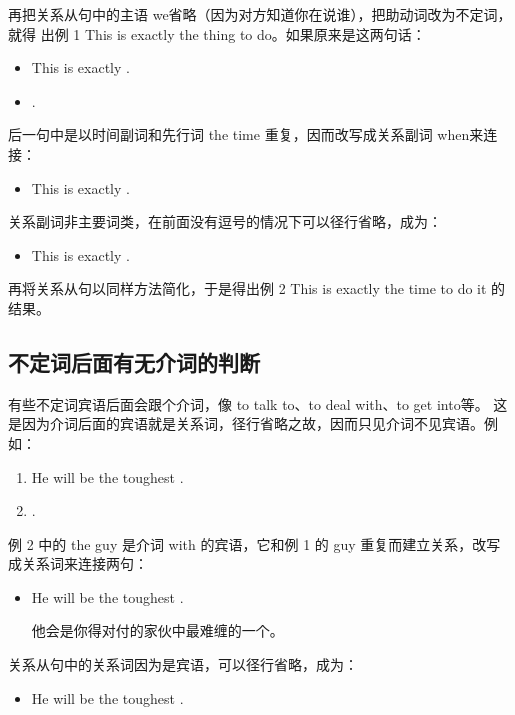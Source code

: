 再把关系从句中的主语 we省略（因为对方知道你在说谁），把助动词改为不定词，就得
出例 1 This is exactly the thing to do。如果原来是这两句话：
\begin{itemize}
\item This is exactly .
\item {}   .
\end{itemize}

后一句中是以时间副词和先行词 the time 重复，因而改写成关系副词 when来连接：
\begin{itemize}
\item This is exactly  .
\end{itemize}

关系副词非主要词类，在前面没有逗号的情况下可以径行省略，成为：
\begin{itemize}
\item This is exactly  .
\end{itemize}
再将关系从句以同样方法简化，于是得出例 2 This is exactly the time to do it 的
结果。

\subsection{不定词后面有无介词的判断}

有些不定词宾语后面会跟个介词，像 to talk to、to deal with、to get into等。
这是因为介词后面的宾语就是关系词，径行省略之故，因而只见介词不见宾语。例
如：
\begin{enumerate}
\item He will be the toughest .
\item {}   .
\end{enumerate}
例 2 中的 the guy 是介词 with 的宾语，它和例 1 的 guy
重复而建立关系，改写成关系词来连接两句：
\begin{itemize}
\item He will be the toughest  .

  他会是你得对付的家伙中最难缠的一个。
\end{itemize}

关系从句中的关系词因为是宾语，可以径行省略，成为：
\begin{itemize}
\item He will be the toughest  .
\end{itemize}

